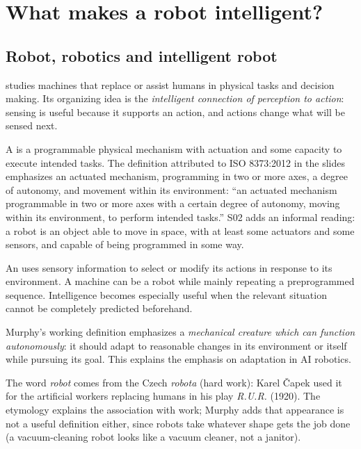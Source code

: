 \section{What makes a robot intelligent?}
\subsection{Robot, robotics and intelligent robot}
 studies machines that replace or assist humans in physical tasks and decision making. Its organizing idea is the \emph{intelligent connection of perception to action}: sensing is useful because it supports an action, and actions change what will be sensed next.

A  is a programmable physical mechanism with actuation and some capacity to execute intended tasks. The definition attributed to ISO 8373:2012 in the slides emphasizes an actuated mechanism, programming in two or more axes, a degree of autonomy, and movement within its environment: ``an actuated mechanism programmable in two or more axes with a certain degree of autonomy, moving within its environment, to perform intended tasks.'' S02 adds an informal reading: a robot is an object able to move in space, with at least some actuators and some sensors, and capable of being programmed in some way.

An  uses sensory information to select or modify its actions in response to its environment. A machine can be a robot while mainly repeating a preprogrammed sequence. Intelligence becomes especially useful when the relevant situation cannot be completely predicted beforehand.

Murphy's working definition emphasizes a \emph{mechanical creature which can function autonomously}: it should adapt to reasonable changes in its environment or itself while pursuing its goal. This explains the emphasis on adaptation in AI robotics.

The word \emph{robot} comes from the Czech \emph{robota} (hard work): Karel \v{C}apek used it for the artificial workers replacing humans in his play \emph{R.U.R.} (1920). The etymology explains the association with work; Murphy adds that appearance is not a useful definition either, since robots take whatever shape gets the job done (a vacuum-cleaning robot looks like a vacuum cleaner, not a janitor).

